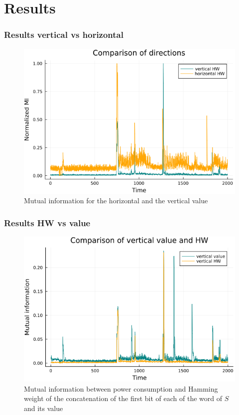 \documentclass{beamer}
\begin{document}
	\section{Results}
	\begin{frame}
		\frametitle{Results vertical vs horizontal}
		\begin{figure}[h]
			\centering
			\includegraphics[scale=0.3]{h_and_v_one_byte}
			\caption{Mutual information for the horizontal and the vertical value}
			\label{hvval}
		\end{figure}
	\end{frame}
	
	\begin{frame}
		\frametitle{Results HW vs value}
		\begin{figure}
			\centering
			\includegraphics[scale=0.3]{vertical_one_bit}
			\caption{Mutual information between power consumption and Hamming weight of the concatenation of the first bit of each of the word of $S$ and its value}
			\label{vHW}
		\end{figure}
	\end{frame}
	
\end{document}
